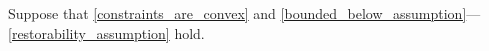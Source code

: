 Suppose that \cref{constraints_are_convex} and \cref{bounded_below_assumption}---\cref{restorability_assumption} hold.
